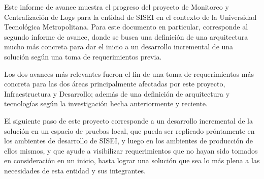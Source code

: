\documentclass[
	spanish, %
	letterpaper, oneside
]{article}
\begin{document}
\templatePortrait

\templatePagecfg

\begin{abstractd}

	Este informe de avance muestra el progreso del proyecto de Monitoreo y Centralización de Logs para la entidad de SISEI en el contexto de la Universidad Tecnológica Metropolitana. Para este documento en particular, corresponde al segundo informe de avance, donde se busca una definición de una arquitectura mucho más concreta para dar el inicio a un desarrollo incremental de una solución según una toma de requerimientos previa.

	Los dos avances más relevantes fueron el fin de una toma de requerimientos más concreta para las dos áreas principalmente afectadas por este proyecto, Infraestructura y Desarrollo; además de una definición de arquitectura y tecnologías según la investigación hecha anteriormente y reciente.

	El siguiente paso de este proyecto corresponde a un desarrollo incremental de la solución en un espacio de pruebas local, que pueda ser replicado próntamente en los ambientes de desarrollo de SISEI, y luego en los ambientes de producción de ellos mismos, y que ayude a visibilizar requerimientos que no hayan sido tomados en consideración en un inicio, hasta lograr una solución que sea lo más plena a las necesidades de esta entidad y sus integrantes.

\end{abstractd}

\templateIndex

\templateFinalcfg













\nocite{alberdi_2020}
\nocite{sharif_2022}
\nocite{schwaber2020scrum}
\nocite{Anonymous}



\end{document}
